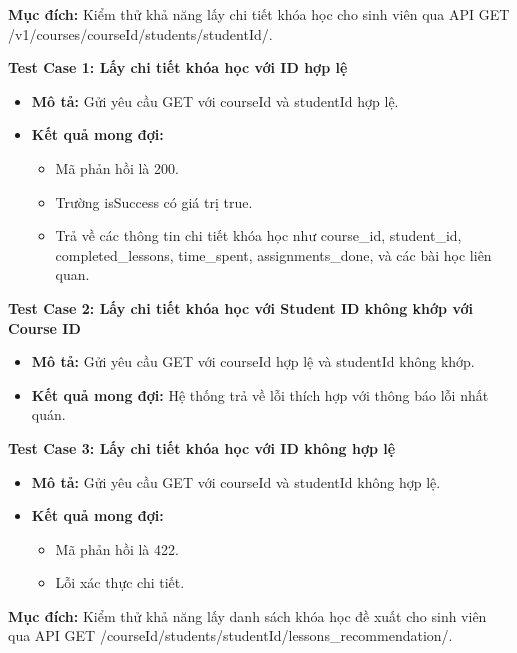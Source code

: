 
\textbf{Mục đích:} Kiểm thử khả năng lấy chi tiết khóa học cho sinh viên qua API GET /v1/courses/{courseId}/students/{studentId}/.

\textbf{Test Case 1: Lấy chi tiết khóa học với ID hợp lệ}
\begin{itemize}
    \item \textbf{Mô tả:} Gửi yêu cầu GET với courseId và studentId hợp lệ.
    \item \textbf{Kết quả mong đợi:}
    \begin{itemize}
        \item Mã phản hồi là 200.
        \item Trường isSuccess có giá trị true.
        \item Trả về các thông tin chi tiết khóa học như course\_id, student\_id, completed\_lessons, time\_spent, assignments\_done, và các bài học liên quan.
    \end{itemize}
\end{itemize}

\textbf{Test Case 2: Lấy chi tiết khóa học với Student ID không khớp với Course ID}
\begin{itemize}
    \item \textbf{Mô tả:} Gửi yêu cầu GET với courseId hợp lệ và studentId không khớp.
    \item \textbf{Kết quả mong đợi:} Hệ thống trả về lỗi thích hợp với thông báo lỗi nhất quán.
\end{itemize}

\textbf{Test Case 3: Lấy chi tiết khóa học với ID không hợp lệ}
\begin{itemize}
    \item \textbf{Mô tả:} Gửi yêu cầu GET với courseId và studentId không hợp lệ.
    \item \textbf{Kết quả mong đợi:}
    \begin{itemize}
        \item Mã phản hồi là 422.
        \item Lỗi xác thực chi tiết.
    \end{itemize}
\end{itemize}


\textbf{Mục đích:} Kiểm thử khả năng lấy danh sách khóa học đề xuất cho sinh viên qua API GET /{courseId}/students/{studentId}/lessons\_recommendation/.

